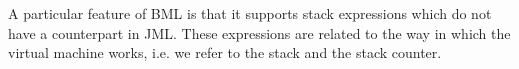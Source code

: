 %             
%             
%             
%                   
%               
%             
%              
%
%   
%
%
A particular feature of BML is that it supports stack expressions which do not have a counterpart in JML.
These expressions are related to
 the way in which the virtual machine works, i.e. we refer to the stack and the stack counter.
